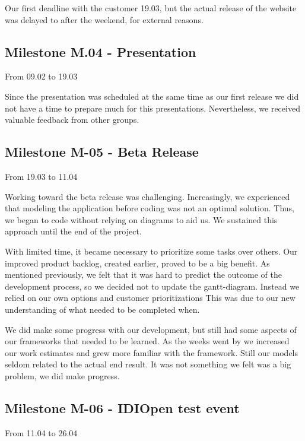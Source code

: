 Our first deadline with the customer 19.03, but the actual release of
the website was delayed to after the weekend, for external reasons. 




\subsection{Milestone M.04 - Presentation}
\label{sec:M04}
From 09.02 to 19.03

Since the presentation was scheduled at the same time as our first
release we did not have a time to prepare much for this presentations.
Nevertheless, we received valuable feedback from other groups.




\subsection{Milestone M-05 - Beta Release}
\label{sec:M05}
From 19.03 to 11.04

Working toward the beta release was challenging. Increasingly, we
experienced that modeling the application before coding was not an
optimal solution. Thus, we began to code without relying on diagrams to
aid us. We sustained this approach until the end of the project.




With limited time, it became necessary to prioritize some tasks over
others. Our improved product backlog, created earlier, proved to be a
big benefit. As mentioned previously, we felt that it was hard to
predict the outcome of the development process, so we decided not to
update the gantt-diagram. Instead we relied on our own options and
customer prioritizations This was due to our new understanding of what
needed to be completed when.




We did make some progress with our development, but still had some
aspects of our frameworks that needed to be learned. As the weeks went
by we increased our work estimates and grew more familiar with the
framework. Still our models seldom related to the actual end result. It
was not something we felt was a big problem, we did make progress. \ 







\subsection{Milestone M-06 - IDIOpen test event}
\label{sec:M06}
From 11.04 to 26.04

